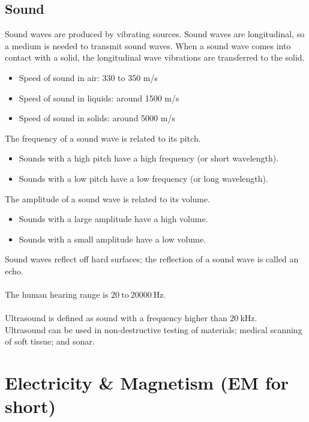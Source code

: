 \documentclass[a4paper,12pt]{article}
\begin{document}
\subsection{Sound}
Sound waves are produced by vibrating sources. Sound waves are longitudinal, so a medium is needed to transmit sound waves. When a sound wave comes into contact with a solid, the longitudinal wave vibrations are transferred to the solid. 
\begin{itemize}
    \item Speed of sound in air: 330 to 350 m/s
    \item Speed of sound in liquids: around 1500 m/s
    \item Speed of sound in solids: around 5000 m/s
\end{itemize}
The frequency of a sound wave is related to its pitch. 
\begin{itemize}
    \item Sounds with a high pitch have a high frequency (or short wavelength).
    \item Sounds with a low pitch have a low frequency (or long wavelength).
\end{itemize}
The amplitude of a sound wave is related to its volume.
\begin{itemize}
    \item Sounds with a large amplitude have a high volume.
    \item Sounds with a small amplitude have a low volume.
\end{itemize}
Sound waves reflect off hard surfaces; the reflection of a sound wave is called an echo.\\\\
The human hearing range is \(20\ \text{to}\ 20000\ \text{Hz}\). \\\\
Ultrasound is defined as sound with a frequency higher than \(20\ \text{kHz}\). \\Ultrasound can be used in non-destructive testing of materials; medical scanning of soft tissue; and sonar. 
\newpage
\section{Electricity \& Magnetism (EM for short)}
\end{document}
